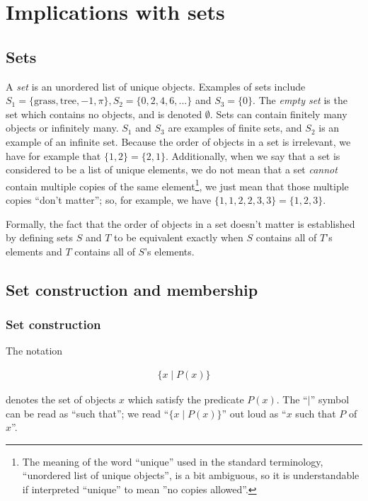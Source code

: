 \newpage

\section{Implications with sets}

\subsection*{Sets}

A \textit{set} is an unordered list of unique objects. Examples of sets include $S_1 = \{\text{grass}, \text{tree}, -1, \pi\}, S_2 = \{0, 2, 4, 6, ...\}$ and $S_3 = \{0\}$. The \textit{empty set} is the set which contains no objects, and is denoted $\emptyset$. Sets can contain finitely many objects or infinitely many. $S_1$ and $S_3$ are examples of finite sets, and $S_2$ is an example of an infinite set. Because the order of objects in a set is irrelevant, we have for example that $\{1, 2\} = \{2, 1\}$. Additionally, when we say that a set is considered to be a list of unique elements, we do not mean that a set \textit{cannot} contain multiple copies of the same element\footnote{The meaning of the word ``unique'' used in the standard terminology, ``unordered list of unique objects'', is a bit ambiguous, so it is understandable if interpreted ``unique'' to mean ''no copies allowed''.}, we just mean that those multiple copies ``don't matter''; so, for example, we have $\{1, 1, 2, 2, 3, 3 \} = \{1, 2, 3\}$.

Formally, the fact that the order of objects in a set doesn't matter is established by defining sets $S$ and $T$ to be equivalent exactly when $S$ contains all of $T$'s elements and $T$ contains all of $S$'s elements.

\subsection*{Set construction and membership}

\subsubsection*{Set construction}

The notation

\begin{align*}
    \{ x \mid P(x) \}
\end{align*}

denotes the set of objects $x$ which satisfy the predicate $P(x)$. The ``$\mid$'' symbol can be read as ``such that''; we read ``$\{ x \mid P(x) \}$'' out loud as ``$x$ such that $P$ of $x$''. 

